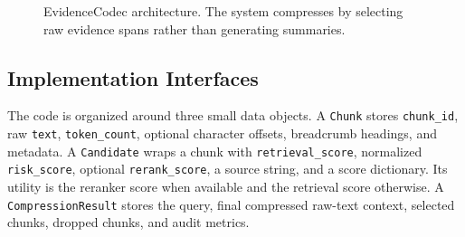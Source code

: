 \documentclass[10pt,twocolumn]{article}
\begin{document}
\begin{figure}[t]
\centering
{}
\caption{EvidenceCodec architecture. The system compresses by selecting raw evidence spans rather than generating summaries.}
\label{fig:architecture}
\end{figure}

\subsection{Implementation Interfaces}
The code is organized around three small data objects. A \texttt{Chunk} stores \texttt{chunk\_id}, raw \texttt{text}, \texttt{token\_count}, optional character offsets, breadcrumb headings, and metadata. A \texttt{Candidate} wraps a chunk with \texttt{retrieval\_score}, normalized \texttt{risk\_score}, optional \texttt{rerank\_score}, a source string, and a score dictionary. Its utility is the reranker score when available and the retrieval score otherwise. A \texttt{CompressionResult} stores the query, final compressed raw-text context, selected chunks, dropped chunks, and audit metrics.
\end{document}
